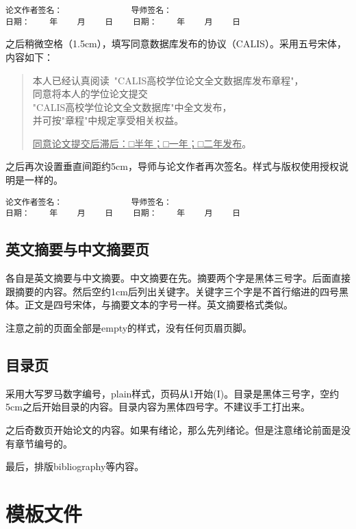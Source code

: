 \documentclass{hnuthesis}%
\begin{document}
\begin{verbatim}
论文作者签名：              导师签名：
日期：    年    月    日    日期：    年    月    日
\end{verbatim}

之后稍微空格（1.5cm），填写同意数据库发布的协议（CALIS）。采用五号宋体，内容如下：

\begin{quote}
本人已经认真阅读~"CALIS高校学位论文全文数据库发布章程"，\\
同意将本人的学位论文提交\\
"CALIS高校学位论文全文数据库"中全文发布，\\
并可按"章程"中规定享受相关权益。

\underline{同意论文提交后滞后：□半年；□一年；□二年发布}。
\end{quote}

之后再次设置垂直间距约5cm，导师与论文作者再次签名。样式与版权使用授权说明是一样的。

\begin{verbatim}
论文作者签名：              导师签名：
日期：    年    月    日    日期：    年    月    日
\end{verbatim}



\section{英文摘要与中文摘要页}


各自是英文摘要与中文摘要。中文摘要在先。摘要两个字是黑体三号字。后面直接跟摘要的内容。然后空约1cm后列出关键字。关键字三个字是不首行缩进的四号黑体。正文是四号宋体，与摘要文本的字号一样。英文摘要格式类似。

注意之前的页面全部是empty的样式，没有任何页眉页脚。


\section{目录页}

采用大写罗马数字编号，plain样式，页码从1开始(I)。目录是黑体三号字，空约5cm之后开始目录的内容。目录内容为黑体四号字。不建议手工打出来。


之后奇数页开始论文的内容。如果有绪论，那么先列绪论。但是注意绪论前面是没有章节编号的。

最后，排版bibliography等内容。
\nwenddocs{}\chapter{模板文件}
\end{document}
